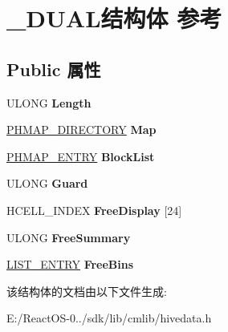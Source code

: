 \hypertarget{struct___d_u_a_l}{}\section{\+\_\+\+D\+U\+A\+L结构体 参考}
\label{struct___d_u_a_l}
\subsection*{Public 属性}
\begin{DoxyCompactItemize}
\item 
\mbox{\label{struct___d_u_a_l_a662ab0876212466b631b220639c015f7}} 
U\+L\+O\+NG {\bfseries Length}
\item 
\mbox{\label{struct___d_u_a_l_ab2406447cdf72b5692b9df186a505f78}} 
\hyperlink{struct___h_m_a_p___d_i_r_e_c_t_o_r_y}{P\+H\+M\+A\+P\+\_\+\+D\+I\+R\+E\+C\+T\+O\+RY} {\bfseries Map}
\item 
\mbox{\label{struct___d_u_a_l_ae8961a79da39b22e11bd758e47631db4}} 
\hyperlink{struct___h_m_a_p___e_n_t_r_y}{P\+H\+M\+A\+P\+\_\+\+E\+N\+T\+RY} {\bfseries Block\+List}
\item 
\mbox{\label{struct___d_u_a_l_ad313a861c0ada554d2b92cd3a351688f}} 
U\+L\+O\+NG {\bfseries Guard}
\item 
\mbox{\label{struct___d_u_a_l_a52064d987ead6355bb0e6dfbaa02c27c}} 
H\+C\+E\+L\+L\+\_\+\+I\+N\+D\+EX {\bfseries Free\+Display} \mbox{[}24\mbox{]}
\item 
\mbox{\label{struct___d_u_a_l_a06e3c0671e8a0ebf8602e43d9cb3421e}} 
U\+L\+O\+NG {\bfseries Free\+Summary}
\item 
\mbox{\label{struct___d_u_a_l_ac33c844260501eeb3b1a8b5b3886be3b}} 
\hyperlink{struct___l_i_s_t___e_n_t_r_y}{L\+I\+S\+T\+\_\+\+E\+N\+T\+RY} {\bfseries Free\+Bins}
\end{DoxyCompactItemize}


该结构体的文档由以下文件生成\+:\begin{DoxyCompactItemize}
\item 
E\+:/\+React\+O\+S-\/0../sdk/lib/cmlib/hivedata.\+h\end{DoxyCompactItemize}
